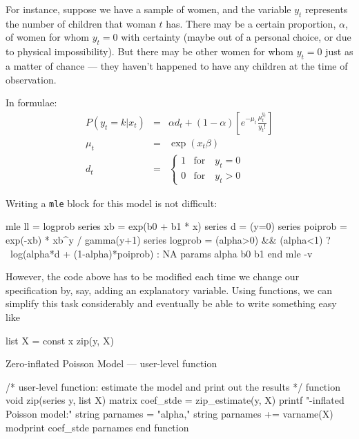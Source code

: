 For instance, suppose we have a sample of women, and the variable $y_t$
represents the number of children that woman $t$ has. There may be a
certain proportion, $\alpha$, of women for whom $y_t = 0$ with certainty
(maybe out of a personal choice, or due to physical impossibility). 
But there may be other women for whom $y_t = 0$ just as a matter of
chance --- they haven't happened to have any children at the time
of observation.

In formulae:
\begin{eqnarray*}
  P(y_t = k | x_t) & = & \alpha d_t + (1 - \alpha) 
  \left[e^{-\mu_t} \frac{\mu_t^{y_t}}{y_t!}\right] \\
    \mu_t & = & \exp(x_t \beta) \\
    d_t & = & 
    \left\{ 
      \begin{array}{ll} 
        1 & \mathrm{for} \quad y_t = 0 \\ 
        0 & \mathrm{for} \quad y_t > 0 
      \end{array}
    \right. 
\end{eqnarray*}

Writing a \texttt{mle} block for this model is not difficult:
\begin{code}
mle ll = logprob
  series xb = exp(b0 + b1 * x)
  series d = (y=0)
  series poiprob = exp(-xb) * xb^y / gamma(y+1)
  series logprob = (alpha>0) && (alpha<1) ? \
    log(alpha*d + (1-alpha)*poiprob) : NA
  params alpha b0 b1
end mle -v
\end{code}

However, the code above has to be modified each time we change our
specification by, say, adding an explanatory variable.  Using
functions, we can simplify this task considerably and eventually be
able to write something easy like
\begin{code}
list X = const x
zip(y, X)
\end{code}

\begin{script}[htbp]
  \caption{Zero-inflated Poisson Model --- user-level function}
  \label{mle-zip-main}
\begin{scode}
/*
  user-level function: estimate the model and print out
  the results
*/
function void zip(series y, list X)
    matrix coef_stde = zip_estimate(y, X)
    printf "\nZero-inflated Poisson model:\n"
    string parnames = "alpha,"
    string parnames += varname(X)
    modprint coef_stde parnames
end function
\end{scode}
\end{script}

